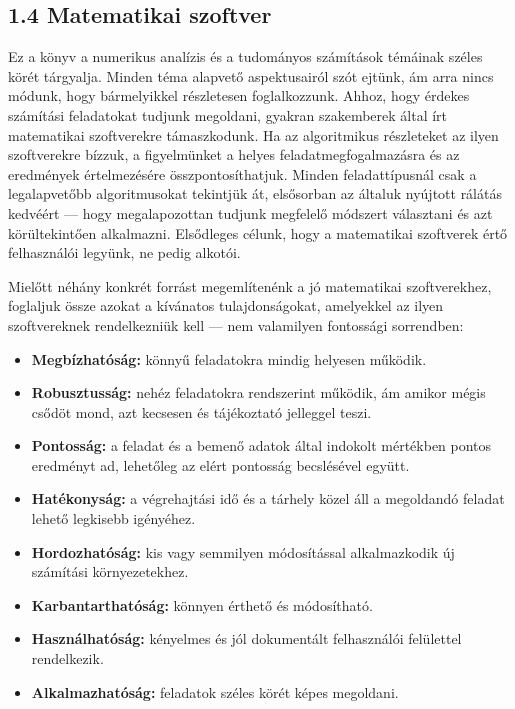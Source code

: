 \documentclass[
  magyar,
  11pt]{article}
\providecommand{\tightlist}{%
  \setlength{\itemsep}{0pt}\setlength{\parskip}{0pt}}
\begin{document}
\subsection{1.4 Matematikai szoftver}\label{matematikai-szoftver}

Ez a könyv a numerikus analízis és a tudományos számítások témáinak
széles körét tárgyalja. Minden téma alapvető aspektusairól szót ejtünk,
ám arra nincs módunk, hogy bármelyikkel részletesen foglalkozzunk.
Ahhoz, hogy érdekes számítási feladatokat tudjunk megoldani, gyakran
szakemberek által írt matematikai szoftverekre támaszkodunk. Ha az
algoritmikus részleteket az ilyen szoftverekre bízzuk, a figyelmünket a
helyes feladatmegfogalmazásra és az eredmények értelmezésére
összpontosíthatjuk. Minden feladattípusnál csak a legalapvetőbb
algoritmusokat tekintjük át, elsősorban az általuk nyújtott rálátás
kedvéért --- hogy megalapozottan tudjunk megfelelő módszert választani
és azt körültekintően alkalmazni. Elsődleges célunk, hogy a matematikai
szoftverek értő felhasználói legyünk, ne pedig alkotói.

Mielőtt néhány konkrét forrást megemlítenénk a jó matematikai
szoftverekhez, foglaljuk össze azokat a kívánatos tulajdonságokat,
amelyekkel az ilyen szoftvereknek rendelkezniük kell --- nem valamilyen
fontossági sorrendben:

\begin{itemize}
\tightlist
\item
  \textbf{Megbízhatóság:} könnyű feladatokra mindig helyesen működik.
\item
  \textbf{Robusztusság:} nehéz feladatokra rendszerint működik, ám
  amikor mégis csődöt mond, azt kecsesen és tájékoztató jelleggel teszi.
\item
  \textbf{Pontosság:} a feladat és a bemenő adatok által indokolt
  mértékben pontos eredményt ad, lehetőleg az elért pontosság
  becslésével együtt.
\item
  \textbf{Hatékonyság:} a végrehajtási idő és a tárhely közel áll a
  megoldandó feladat lehető legkisebb igényéhez.
\item
  \textbf{Hordozhatóság:} kis vagy semmilyen módosítással alkalmazkodik
  új számítási környezetekhez.
\item
  \textbf{Karbantarthatóság:} könnyen érthető és módosítható.
\item
  \textbf{Használhatóság:} kényelmes és jól dokumentált felhasználói
  felülettel rendelkezik.
\item
  \textbf{Alkalmazhatóság:} feladatok széles körét képes megoldani.
\end{itemize}
\end{document}
